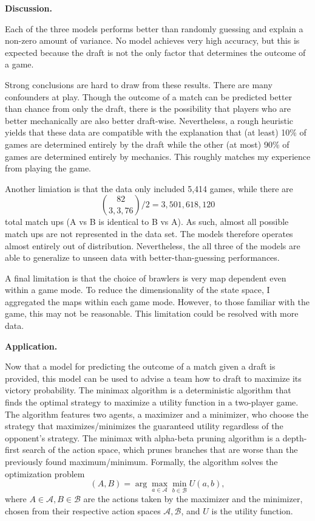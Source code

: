 \documentclass[12pt]{article}
\begin{document}
\textbf{Discussion.}

Each of the three models performs better than randomly guessing and explain a non-zero amount of variance. No model achieves very high accuracy, but this is expected because the draft is not the only factor that determines the outcome of a game.

Strong conclusions are hard to draw from these results. There are many confounders at play. Though the outcome of a match can be predicted better than chance from only the draft, there is the possibility that players who are better mechanically are also better draft-wise. Nevertheless, a rough heuristic yields that these data are compatible with the explanation that (at least) 10\% of games are determined entirely by the draft while the other (at most) 90\% of games are determined entirely by mechanics. This roughly matches my experience from playing the game.

Another limiation is that the data only included 5,414 games, while there are 
$$\binom{82}{3,3,76} \big/ 2 = 3,501,618,120$$
total match ups (A vs B is identical to B vs A). As such, almost all possible match ups are not represented in the data set. The models therefore operates almost entirely out of distribution. Nevertheless, the all three of the models are able to generalize to unseen data with better-than-guessing performances.

A final limitation is that the choice of brawlers is very map dependent even within a game mode. To reduce the dimensionality of the state space, I aggregated the maps within each game mode. However, to those familiar with the game, this may not be reasonable. This limitation could be resolved with more data.

\textbf{Application.} 

Now that a model for predicting the outcome of a match given a draft is provided, this model can be used to advise a team how to draft to maximize its victory probability. The minimax algorithm is a deterministic algorithm that finds the optimal strategy to maximize a utility function in a two-player game. The algorithm features two agents, a maximizer and a minimizer, who choose the strategy that maximizes/minimizes the guaranteed utility regardless of the opponent's strategy. The minimax with alpha-beta pruning algorithm is a depth-first search of the action space, which prunes branches that are worse than the previously found maximum/minimum. Formally, the algorithm solves the optimization problem 
$$(A, B) = \arg\max_{a \in \mathcal{A}} \min_{b \in \mathcal{B}} U(a, b),$$
where $A \in \mathcal{A}, B \in \mathcal{B}$ are the actions taken by the maximizer and the minimizer, chosen from their respective action spaces $\mathcal{A}, \mathcal{B}$, and $U$ is the utility function.
\end{document}
